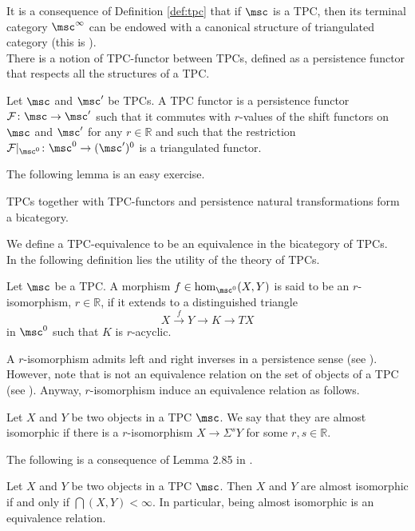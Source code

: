 It is a consequence of Definition \ref{def:tpc} that if $\msc$ is a TPC, then its terminal category $\msc^\infty$ can be endowed with a canonical structure of triangulated category (this is \cite[Proposition 2.39(ii)]{BCZ:tpc}).\\

There is a notion of TPC-functor between TPCs, defined as a persistence functor that respects all the structures of a TPC.
\begin{dfn}
    Let $\msc$ and $\msc'$ be TPCs. A TPC functor is a persistence functor $\mathcal{F}\colon \msc\to \msc'$ such that it commutes with $r$-values of the shift functors on $\msc$ and $\msc'$ for any $r\in\mathbb{R}$ and such that the restriction $\mathcal{F}\vert_{\msc^0}\colon \msc^0\to (\msc')^0$ is a triangulated functor.
\end{dfn}
The following lemma is an easy exercise.
\begin{lem}
    TPCs together with TPC-functors and persistence natural transformations form a bicategory.
\end{lem}
We define a TPC-equivalence to be an equivalence in the bicategory of TPCs.\\

In the following definition lies the utility of the theory of TPCs.
\begin{dfn}
    Let $\msc$ be a TPC. A morphism $f\in \hom_{\msc^0}(X,Y)$ is said to be an $r$-isomorphism, $r\in \mathbb{R}$, if it extends to a distinguished triangle $$X\xrightarrow{f}Y\to K\to TX$$ in $\msc^0$ such that $K$ is $r$-acyclic.
\end{dfn}

\noindent A $r$-isomorphism admits left and right inverses in a persistence sense (see \cite[Proposition 2.28(i)]{BCZ:tpc}). However, note that  is not an equivalence relation on the set of objects of a TPC (see \cite[Proposition 2.28(i)]{BCZ:tpc}). Anyway, $r$-isomorphism induce an equivalence relation as follows.

\begin{dfn}
    Let $X$ and $Y$ be two objects in a TPC $\msc$. We say that they are almost isomorphic if there is a $r$-isomorphism $X\to \Sigma^sY$ for some $r,s\in \mathbb{R}$.
\end{dfn}
The following is a consequence of Lemma 2.85 in \cite{BCZ:tpc}.
\begin{lem}
    Let $X$ and $Y$ be two objects in a TPC $\msc$. Then $X$ and $Y$ are almost isomorphic if and only if $\dint(X,Y)<\infty$. In particular, being almost isomorphic is an equivalence relation.
\end{lem}

